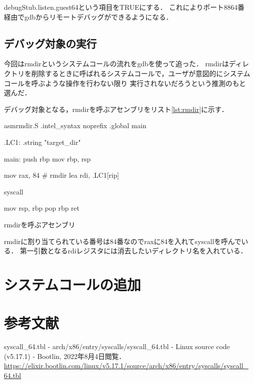 \documentclass[12pt,a4paper,dvipdfmx]{jsreport}
\begin{document}
debugStub.listen.guest64という項目をTRUEにする．
これによりポート8864番経由でgdbからリモートデバッグができるようになる．

\section{デバッグ対象の実行}
今回はrmdirというシステムコールの流れをgdbを使って追った．
rmdirはディレクトリを削除するときに呼ばれるシステムコールで，ユーザが意図的にシステムコールを呼ぶような操作を行わない限り
実行されないだろうという推測のもと選んだ．

デバッグ対象となる，rmdirを呼ぶアセンブリをリスト\ref{lst:rmdir}に示す．
\begin{longlisting}
\begin{myminted}{asm}{rmdir.S}
.intel_syntax noprefix
.global main

.LC1:
    .string "target_dir"

main:
    push rbp
    mov rbp, rsp

    mov rax, 84 # rmdir
    lea rdi, .LC1[rip]

    syscall

    mov rsp, rbp
    pop rbp
    ret
\end{myminted}
    \caption{rmdirを呼ぶアセンブリ}
\label{lst:rmdir}
\end{longlisting}

rmdirに割り当てられている番号は84番\cite{syscall}なのでraxに84を入れてsyscallを呼んでいる．
第一引数となるrdiレジスタには消去したいディレクトリ名を入れている．

\chapter{システムコールの追加}

\chapter{参考文献}
\begin{thebibliography}{9}
     syscall_64.tbl - arch/x86/entry/syscalls/syscall_64.tbl - Linux source code (v5.17.1) - Bootlin,
        2022年8月4日閲覧．
        \url{https://elixir.bootlin.com/linux/v5.17.1/source/arch/x86/entry/syscalls/syscall_64.tbl}
\end{thebibliography}
\end{document}
